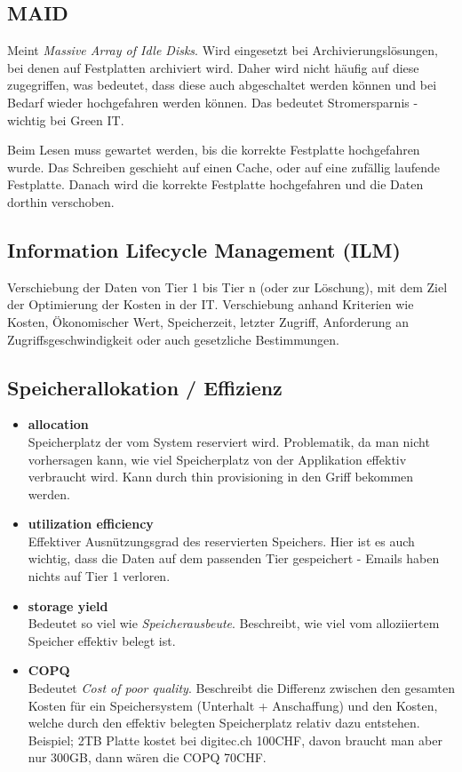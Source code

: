 \subsection{MAID}\label{sec:maid}
Meint \emph{Massive Array of Idle Disks}. Wird eingesetzt bei Archivierungslösungen, bei denen auf Festplatten archiviert wird. Daher wird nicht häufig auf diese zugegriffen, was bedeutet, dass diese auch abgeschaltet werden können und bei Bedarf wieder hochgefahren werden können. Das bedeutet Stromersparnis - wichtig bei Green IT.

Beim Lesen muss gewartet werden, bis die korrekte Festplatte hochgefahren wurde. Das Schreiben geschieht auf einen Cache, oder auf eine zufällig laufende Festplatte. Danach wird die korrekte Festplatte hochgefahren und die Daten dorthin verschoben.
\subsection{Information Lifecycle Management (ILM)}
Verschiebung der Daten von Tier 1 bis Tier n (oder zur Löschung), mit dem Ziel der Optimierung der Kosten in der IT. Verschiebung anhand Kriterien wie Kosten, Ökonomischer Wert, Speicherzeit, letzter Zugriff, Anforderung an Zugriffsgeschwindigkeit oder auch gesetzliche Bestimmungen.
\subsection{Speicherallokation / Effizienz}\label{sec:speichereffizienz}
\begin{itemize}
	\item \textbf{allocation} \\
		Speicherplatz der vom System reserviert wird. Problematik, da man nicht vorhersagen kann, wie viel Speicherplatz von der Applikation effektiv verbraucht wird. Kann durch thin provisioning in den Griff bekommen werden.
	\item \textbf{utilization efficiency} \\
		Effektiver Ausnützungsgrad des reservierten Speichers. Hier ist es auch wichtig, dass die Daten auf dem passenden Tier gespeichert - Emails haben nichts auf Tier 1 verloren. 
	\item \textbf{storage yield} \\
		Bedeutet so viel wie \emph{Speicherausbeute}. Beschreibt, wie viel vom alloziiertem Speicher effektiv belegt ist.
	\item \textbf{COPQ} \\
		Bedeutet \emph{Cost of poor quality}. Beschreibt die Differenz zwischen den gesamten Kosten für ein Speichersystem (Unterhalt + Anschaffung) und den Kosten, welche durch den effektiv belegten Speicherplatz relativ dazu entstehen. Beispiel; 2TB Platte kostet bei digitec.ch 100CHF, davon braucht man aber nur 300GB, dann wären die COPQ 70CHF.
\end{itemize}

